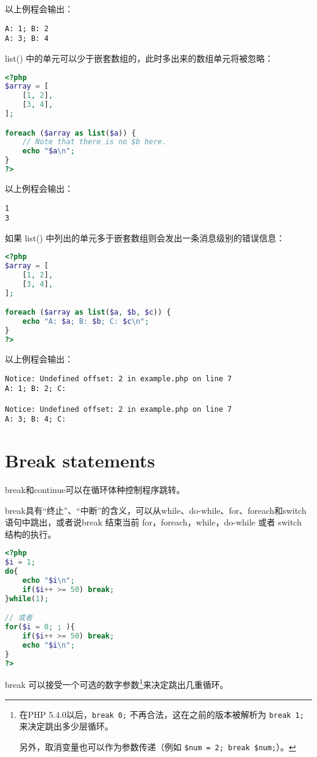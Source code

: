 以上例程会输出：

\begin{verbatim}
A: 1; B: 2
A: 3; B: 4
\end{verbatim}

list() 中的单元可以少于嵌套数组的，此时多出来的数组单元将被忽略：

\begin{lstlisting}[language=PHP]
<?php
$array = [
    [1, 2],
    [3, 4],
];

foreach ($array as list($a)) {
    // Note that there is no $b here.
    echo "$a\n";
}
?>
\end{lstlisting}

以上例程会输出：

\begin{verbatim}
1
3
\end{verbatim}

如果 list() 中列出的单元多于嵌套数组则会发出一条消息级别的错误信息：


\begin{lstlisting}[language=PHP]
<?php
$array = [
    [1, 2],
    [3, 4],
];

foreach ($array as list($a, $b, $c)) {
    echo "A: $a; B: $b; C: $c\n";
}
?>
\end{lstlisting}

以上例程会输出：


\begin{verbatim}
Notice: Undefined offset: 2 in example.php on line 7
A: 1; B: 2; C: 

Notice: Undefined offset: 2 in example.php on line 7
A: 3; B: 4; C: 
\end{verbatim}

\section{Break statements}

break和continue可以在循环体种控制程序跳转。

break具有“终止”、“中断”的含义，可以从while、do-while、for、foreach和switch语句中跳出，或者说break 结束当前 for，foreach，while，do-while 或者 switch 结构的执行。

\begin{lstlisting}[language=PHP]
<?php
$i = 1;
do{
	echo "$i\n";
	if($i++ >= 50) break;
}while(1);

// 或者
for($i = 0; ; ){
	if($i++ >= 50) break;
	echo "$i\n";
}
?>
\end{lstlisting}

break 可以接受一个可选的数字参数\footnote{在PHP 5.4.0以后，\texttt{break 0;} 不再合法，这在之前的版本被解析为 \texttt{break 1;}来决定跳出多少层循环。

另外，取消变量也可以作为参数传递（例如 \texttt{\$num = 2; break \$num;}）。}来决定跳出几重循环。


